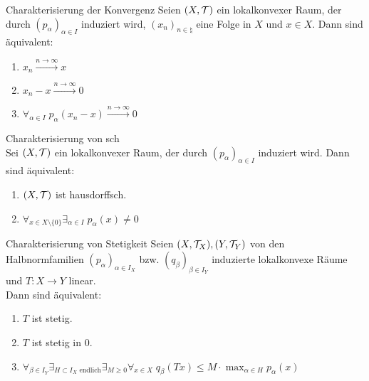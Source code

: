 \begin{Lemma}{Charakterisierung der Konvergenz}
    Seien $(X, \mathcal{T})$ ein lokalkonvexer Raum, der durch $(p_\alpha)_{\alpha \in I}$ induziert wird,
    $(x_n)_{n \in \natural}$ eine Folge in $X$ und $x \in X$.
    Dann sind äquivalent:
    \begin{enumerate}
        \item
        $x_n \xrightarrow{n \to \infty} x$
        
        \item
        $x_n - x \xrightarrow{n \to \infty} 0$
        
        \item
        $\forall_{\alpha \in I}\; p_\alpha(x_n - x) \xrightarrow{n \to \infty} 0$
    \end{enumerate}
\end{Lemma}

\linie

\begin{Lemma}{Charakterisierung von sch}\\
    Sei $(X, \mathcal{T})$ ein lokalkonvexer Raum, der durch $(p_\alpha)_{\alpha \in I}$ induziert wird.
    Dann sind äquivalent:
    \begin{enumerate}
        \item
        $(X, \mathcal{T})$ ist hausdorffsch.
        
        \item
        $\forall_{x \in X \setminus \{0\}} \exists_{\alpha \in I}\; p_\alpha(x) \not= 0$
    \end{enumerate}
\end{Lemma}

\linie

\begin{Lemma}{Charakterisierung von Stetigkeit}
    Seien $(X, \mathcal{T}_X), (Y, \mathcal{T}_Y)$ von den Halbnormfamilien $(p_\alpha)_{\alpha \in I_X}$ bzw.
    $(q_\beta)_{\beta \in I_Y}$ induzierte lokalkonvexe Räume und $T\colon X \rightarrow Y$
    linear.\\
    Dann sind äquivalent:
    \begin{enumerate}
        \item
        $T$ ist stetig.
        
        \item
        $T$ ist stetig in $0$.
        
        \item
        $\forall_{\beta \in I_Y} \exists_{H \subset I_X \text{ endlich}} \exists_{M \ge 0}
        \forall_{x \in X}\; q_\beta(Tx) \le M \cdot \max_{\alpha \in H} p_\alpha(x)$
    \end{enumerate}
\end{Lemma}

